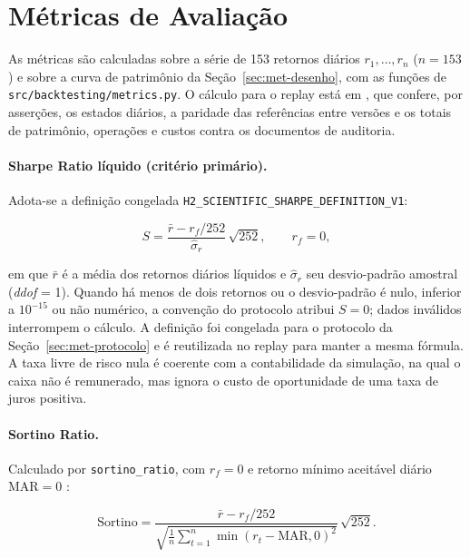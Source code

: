 \section{Métricas de Avaliação}
\label{sec:met-metricas}

As métricas são calculadas sobre a série de 153 retornos diários $r_1, \ldots, r_n$ ($n = 153$) e sobre a curva de patrimônio da Seção~\ref{sec:met-desenho}, com as funções de \texttt{src/backtesting/metrics.py}. O cálculo para o replay está em , que confere, por asserções, os estados diários, a paridade das referências entre versões e os totais de patrimônio, operações e custos contra os documentos de auditoria.

\paragraph*{Sharpe Ratio líquido (critério primário).} Adota-se a definição congelada \texttt{H2\_SCIENTIFIC\_SHARPE\_DEFINITION\_V1}:

\begin{equation}
S = \frac{\bar{r} - r_f/252}{\hat{\sigma}_r}\,\sqrt{252}, \qquad r_f = 0,
\label{eq:met-sharpe}
\end{equation}

\noindent em que $\bar{r}$ é a média dos retornos diários líquidos e $\hat{\sigma}_r$ seu desvio-padrão amostral (\textit{ddof} = 1). Quando há menos de dois retornos ou o desvio-padrão é nulo, inferior a $10^{-15}$ ou não numérico, a convenção do protocolo atribui $S = 0$; dados inválidos interrompem o cálculo. A definição foi congelada para o protocolo da Seção~\ref{sec:met-protocolo} e é reutilizada no replay para manter a mesma fórmula. A taxa livre de risco nula é coerente com a contabilidade da simulação, na qual o caixa não é remunerado, mas ignora o custo de oportunidade de uma taxa de juros positiva.

\paragraph*{Sortino Ratio.} Calculado por \texttt{sortino\_ratio}, com $r_f = 0$ e retorno mínimo aceitável diário $\text{MAR} = 0$ \citep{Sortino1994}:

\begin{equation}
\text{Sortino} = \frac{\bar{r} - r_f/252}{\sqrt{\frac{1}{n}\sum_{t=1}^{n}\min(r_t - \text{MAR}, 0)^2}}\,\sqrt{252}.
\label{eq:met-sortino}
\end{equation}

